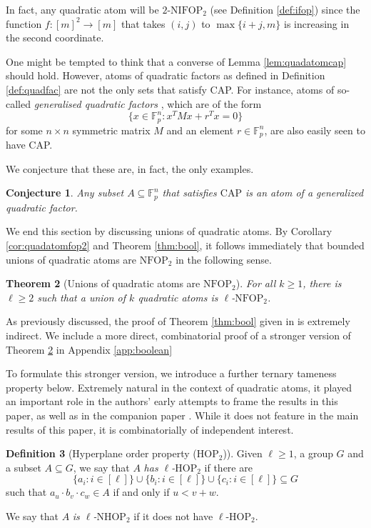\documentclass[12pt,oneside,british,a4wide]{amsart}
\newtheorem{theorem}{Theorem}[section]
\newtheorem{conjecture}[theorem]{Conjecture}
\numberwithin{equation}{section}
\theoremstyle{definition}
\newtheorem{definition}[theorem]{Definition}
\def\F{\mathbb{F}}
\def\NFOP{\mathrm{NFOP}}
\def\HOP{\mathrm{HOP}}
\def\NHOP{\mathrm{NHOP}}
\def\ra{\rightarrow}
\begin{document}
In fact, any quadratic atom will be $2$-$\mathrm{NIFOP}_2$ (see Definition \ref{def:ifop}) since the function $f:[m]^2\ra [m]$ that takes $(i,j)$ to $\max\{i+j,m\}$ is increasing in the second coordinate. 
 
One might be tempted to think that a converse of Lemma \ref{lem:quadatomcap} should hold. However, atoms of quadratic factors as defined in Definition \ref{def:quadfac} are not the only sets that satisfy CAP. For instance, atoms of so-called \emph{generalised quadratic factors} \cite[Definition 4.3]{Green.2012}, which are of the form 
\[\{x\in \F_p^n: x^TMx +r^Tx=0\}\]
for some $n\times n$ symmetric matrix $M$ and an element $r\in \F_p^n$, are also easily seen to have CAP.

We conjecture that these are, in fact, the only examples.

\begin{conjecture}
Any subset $A\subseteq \F_p^n$ that satisfies $\mathrm{CAP}$ is an atom of a generalized quadratic factor.
\end{conjecture}

We end this section by discussing unions of quadratic atoms. By Corollary \ref{cor:quadatomfop2} and Theorem \ref{thm:bool}, it follows immediately that bounded unions of quadratic atoms are $\NFOP_2$ in the following sense.

\begin{theorem}[Unions of quadratic atoms are $\NFOP_2$]\label{thm:unionsatoms}
For all $k\geq 1$, there is $\ell\geq 2$ such that a union of $k$ quadratic atoms is $\ell$-$\NFOP_2$. 
\end{theorem}

As previously discussed, the proof of Theorem \ref{thm:bool} given in \cite{Terry.2021b} is extremely indirect. We include a more direct, combinatorial proof of a stronger version of Theorem \ref{thm:unionsatoms} in Appendix \ref{app:boolean}

To formulate this stronger version, we introduce a further ternary tameness property below. Extremely natural in the context of quadratic atoms, it played an important role in the authors' early attempts to frame the results in this paper, as well as in the companion paper \cite[Chapter 7]{Terry.2021b}. While it does not feature in the main results of this paper, it is combinatorially of independent interest.  

 \begin{definition}[Hyperplane order property ($\HOP_2$)]\label{def:hop}
Given $\ell\geq 1$, a group $G$ and a subset $A\subseteq G$, we say that $A$ \emph{has \emph{$\ell$-$\HOP_2$}} if there are  
$$
\{a_i: i\in [\ell]\}\cup \{b_i: i\in [\ell]\}\cup \{c_i: i\in [\ell]\}\subseteq G
$$
 such that $a_u \cdot b_v\cdot c_w\in A$ if and only if $u<v+w$.  

We say that $A$ \emph{is $\ell$-$\NHOP_2$} if it does not have $\ell$-$\HOP_2$.
\end{definition}
\end{document}
